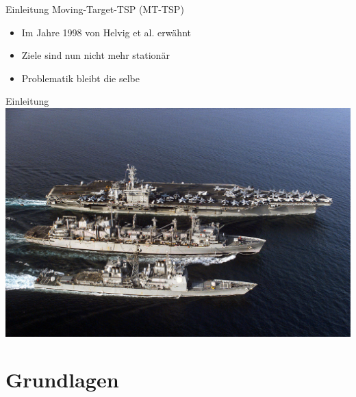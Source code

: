 \documentclass[10pt,table,xcolor=dvipsnames]{beamer}
\begin{document}
\begin{frame}{Einleitung}
Moving-Target-TSP (MT-TSP)
\begin{itemize}
\item
Im Jahre 1998 von Helvig et al. erwähnt \pause
\item
Ziele sind nun nicht mehr stationär \pause
\item
Problematik bleibt die selbe
\end{itemize}

\end{frame}

\begin{frame}{Einleitung}
\centering
\includegraphics[scale=0.8]{Images/Versorgungsschiff.jpg}
\end{frame}

\section{Grundlagen}
\end{document}
